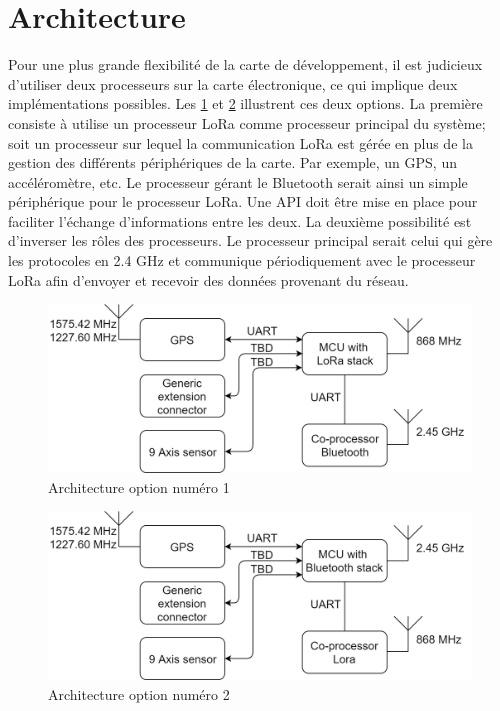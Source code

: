 \section{Architecture}

Pour une plus grande flexibilité de la carte de développement, il est judicieux d'utiliser deux processeurs sur la carte électronique, ce qui implique deux implémentations possibles. Les \cref{fig-hardware_option1} et \cref{fig-hardware_option2} illustrent ces deux options. La première consiste à utilise un processeur LoRa comme processeur principal du système; soit un processeur sur lequel la communication LoRa est gérée en plus de la gestion des différents périphériques de la carte. Par exemple, un GPS, un accéléromètre, etc. Le processeur gérant le Bluetooth serait ainsi un simple périphérique pour le processeur LoRa. Une API doit être mise en place pour faciliter l'échange d'informations entre les deux. La deuxième possibilité est d'inverser les rôles des processeurs. Le processeur principal serait celui qui gère les protocoles en 2.4 GHz et communique périodiquement avec le processeur LoRa afin d'envoyer et recevoir des données provenant du réseau.

\begin{figure}[ht!]
    \centering
    \includegraphics[width=\textwidth]{Figures/Hardware/master_onepage_option1.png}
    \caption{Architecture option numéro 1}
    \label{fig-hardware_option1}
\end{figure}

\begin{figure}[ht!]
    \centering
    \includegraphics[width=\textwidth]{Figures/Hardware/master_onepage_option2.png}
    \caption{Architecture option numéro 2}
    \label{fig-hardware_option2}
\end{figure}


